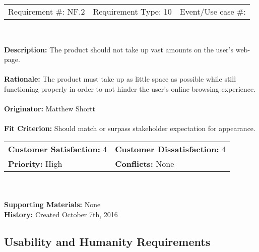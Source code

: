 \documentclass[12pt, titlepage]{article}
\begin{document}
\begin{framed}
	
	\begin{center}
		
		\begin{tabular}{ l c r }
			Requirement \#: NF.2 & Requirement Type: 10 & Event/Use case \#: \\
		\end{tabular} \\
	\end{center}
	\textbf{Description:} The product should not take up vast amounts on the user's 
	web-page.\\
	\\
	\textbf{Rationale:} The product must take up as little space as possible while still 
	functioning properly in order to not hinder the user's online browsing experience.  \\
	\\
	\textbf{Originator:} Matthew Shortt \\
	\\
	\textbf{Fit Criterion:} Should match or surpass stakeholder expectation for appearance.  
	\\
	
	\begin{tabular}{ll}
		\textbf{Customer Satisfaction:} 4 & \textbf{Customer Dissatisfaction:} 4 \\
		\textbf{Priority:} High & \textbf{Conflicts:} None\\
	\end{tabular} \\
	\\
	\textbf{Supporting Materials:} None \\
	\textbf{History:} Created October 7th, 2016
	
\end{framed}

\subsection{Usability and Humanity Requirements}
\end{document}
